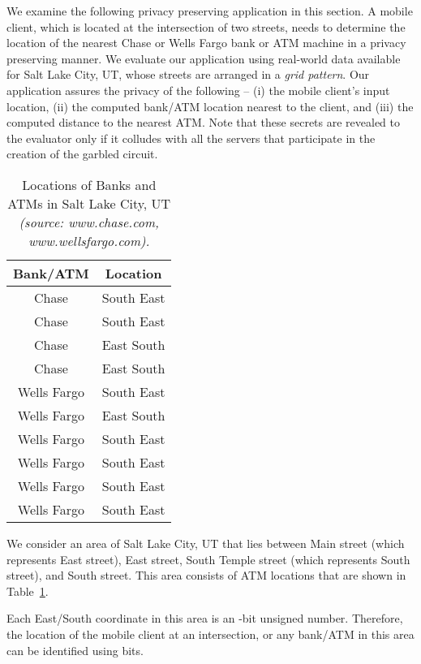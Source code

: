 \documentclass[10pt,journal,cspaper,compsoc]{IEEEtran}
\begin{document}
We examine the following privacy preserving application in this section. A mobile client, which is located at the intersection of two streets, needs to determine the location of the nearest Chase or Wells Fargo bank or ATM machine in a privacy preserving manner. We evaluate our application using real-world data available for Salt Lake City, UT, whose streets are arranged in a {\em grid pattern}. Our application assures the privacy of the following -- (i) the mobile client's input location, (ii) the computed bank/ATM location nearest to the client, and (iii) the computed distance to the nearest ATM. Note that these secrets are revealed to the evaluator only if it colludes with all the  servers that participate in the creation of the garbled circuit.


\begin{table}[!t]
\renewcommand{\arraystretch}{1.3}
\caption{Locations of Banks and ATMs in Salt Lake City, UT {\em (source: www.chase.com, www.wellsfargo.com).}}
\label{table_atm_locations}
\centering
\begin{tabular}{||c||c||}
\hline
\bfseries Bank/ATM & \bfseries Location\\
\hline
Chase &  South  East\\
\hline
Chase &  South  East\\
\hline
Chase &  East  South\\
\hline
Chase &  East  South\\
\hline
Wells Fargo &  South  East\\
\hline
Wells Fargo &  East  South\\
\hline
Wells Fargo &  South  East\\
\hline
Wells Fargo &  South  East\\
\hline
Wells Fargo &  South  East\\
\hline
Wells Fargo &  South  East\\
\hline
\end{tabular}
\end{table}


We consider an area of Salt Lake City, UT that lies between Main street (which represents  East street),  East street, South Temple street (which represents  South street), and  South street. This area consists of  ATM locations that are shown in Table~\ref{table_atm_locations}.


Each East/South coordinate in this area is an -bit unsigned number. Therefore, the location of the mobile client at an intersection, or any bank/ATM in this area can be identified using  bits.
\end{document}
